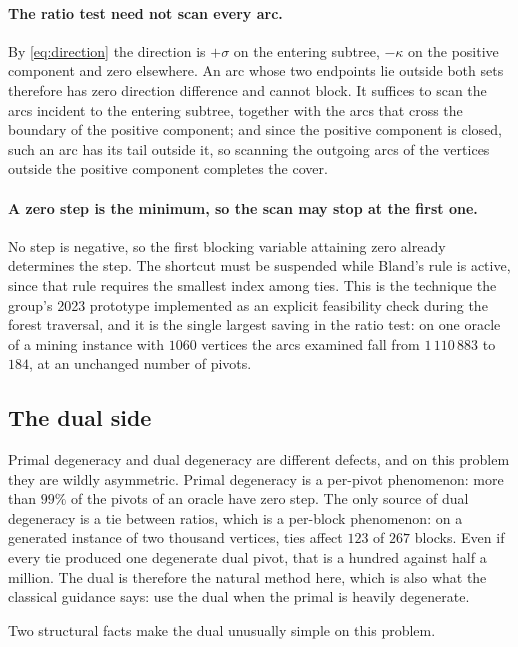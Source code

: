 \paragraph{The ratio test need not scan every arc.} By
\eqref{eq:direction} the direction is $+\sigma$ on the entering subtree,
$-\kappa$ on the positive component and zero elsewhere. An arc whose two
endpoints lie outside both sets therefore has zero direction difference and
cannot block. It suffices to scan the arcs incident to the entering subtree,
together with the arcs that cross the boundary of the positive component; and
since the positive component is closed, such an arc has its tail outside it, so
scanning the outgoing arcs of the vertices outside the positive component completes
the cover.

\paragraph{A zero step is the minimum, so the scan may stop at the first one.}
No step is negative, so the first blocking variable attaining zero already
determines the step. The shortcut must be suspended while Bland's rule is
active, since that rule requires the smallest index among ties. This is the
technique the group's 2023 prototype implemented as an explicit feasibility
check during the forest traversal, and it is the single largest saving in the
ratio test: on one oracle of a mining instance with $1060$ vertices the arcs
examined fall from $1\,110\,883$ to $184$, at an unchanged number of pivots.

\subsection{The dual side}\label{sec:dual}

Primal degeneracy and dual degeneracy are different defects, and on this problem
they are wildly asymmetric. Primal degeneracy is a per-pivot phenomenon: more
than $99\%$ of the pivots of an oracle have zero step. The only source of dual
degeneracy is a tie between ratios, which is a per-block phenomenon: on a
generated instance of two thousand vertices, ties affect $123$ of $267$ blocks. Even
if every tie produced one degenerate dual pivot, that is a hundred against half a
million. The dual is therefore the natural method here, which is also what the
classical guidance says: use the dual when the primal is heavily degenerate.

Two structural facts make the dual unusually simple on this problem.

